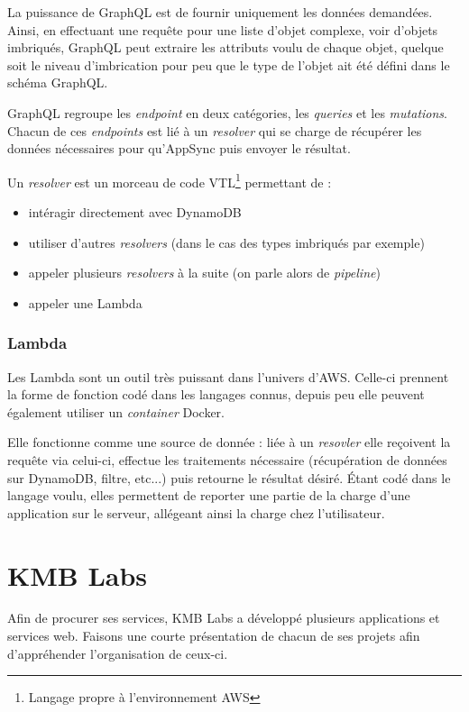 \documentclass[12pt,a4paper,oneside]{scrreprt}
\begin{document}
La puissance de GraphQL est de fournir uniquement les données demandées. Ainsi, en effectuant une requête pour une liste d'objet complexe, voir d'objets imbriqués, GraphQL peut extraire les attributs voulu de chaque objet, quelque soit le niveau d'imbrication pour peu que le type de l'objet ait été défini dans le schéma GraphQL.

GraphQL regroupe les \textit{endpoint} en deux catégories, les \textit{queries} et les \textit{mutations}. Chacun de ces \textit{endpoints} est lié à un \textit{resolver} qui se charge de récupérer les données nécessaires pour qu'AppSync puis envoyer le résultat.

Un \textit{resolver} est un morceau de code VTL\footnote{Langage propre à l'environnement AWS} permettant de :
\begin{itemize}
	\item intéragir directement avec DynamoDB
	\item utiliser d'autres \textit{resolvers} (dans le cas des types imbriqués par exemple)
	\item appeler plusieurs \textit{resolvers} à la suite (on parle alors de \textit{pipeline})
	\item appeler une Lambda
\end{itemize}

\subsection*{Lambda}

Les Lambda sont un outil très puissant dans l'univers d'AWS. Celle-ci prennent la forme de fonction codé dans les langages connus, depuis peu elle peuvent également utiliser un \textit{container} Docker.

Elle fonctionne comme une source de donnée : liée à un \textit{resovler} elle reçoivent la requête via celui-ci, effectue les traitements nécessaire (récupération de données sur DynamoDB, filtre, etc...) puis retourne le résultat désiré. Étant codé dans le langage voulu, elles permettent de reporter une partie de la charge d'une application sur le serveur, allégeant ainsi la charge chez l'utilisateur.

\chapter{KMB Labs}
Afin de procurer ses services, KMB Labs a développé plusieurs applications et services web. Faisons une courte présentation de chacun de ses projets afin d'appréhender l'organisation de ceux-ci.
\end{document}
